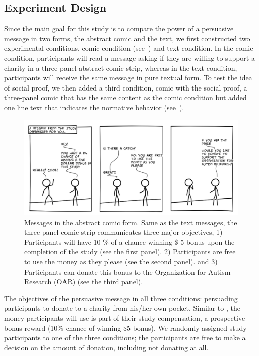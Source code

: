 \subsection{Experiment Design}
Since the main goal for this study is to compare the power of a persuasive message in two forms, the abstract comic and the text, we first constructed two experimental conditions, comic condition (see~) and text condition. In the comic condition, participants will read a message asking if they are willing to support a charity in a three-panel abstract comic strip, whereas in the text condition, participants will receive the same message in pure textual form. To test the idea of social proof, we then added a third condition, comic with the social proof, a three-panel comic that has the same content as the comic condition but added one line text that indicates the normative behavior (see~).

\begin{figure}[bt]
    \centering
    \includegraphics[width=\columnwidth]{./figures/abstract_comic.png}
    \caption{Messages in the abstract comic form. Same as the text messages, the three-panel comic strip communicates three major objectives, 1) Participants will have 10 \% of a chance winning \$ 5 bonus upon the completion of the study (see the first panel). 2) Participants are free to use the money as they please (see the second panel). and 3) Participants can donate this bonus to the Organization for Autism Research (OAR) (see the third panel).}
    \label{fig:basic three comic panel}
\end{figure}

The objectives of the persuasive message in all three conditions: persuading participants to donate to a charity from his/her own pocket. Similar to \textcite{lee2013does}, the money participants will use is part of their study compensation, a prospective bonus reward (10\% chance of winning \$5 bonus). We randomly assigned study participants to one of the three conditions; the participants are free to make a decision on the amount of donation, including not donating at all.

